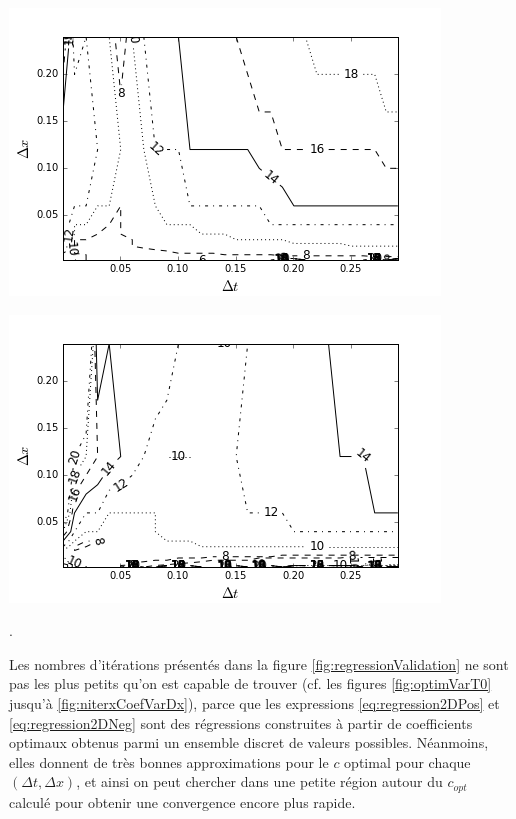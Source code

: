 \begingroup
\noindent
\begin{minipage}[t]{.45\linewidth}
	\includegraphics[scale=.45]{figures/FinalFigures/contourValidationN.png}
\end{minipage}
\hfill
\begin{minipage}[t]{.45\linewidth}
	\includegraphics[scale=.45]{figures/FinalFigures/contourValidationP.png}
\end{minipage}
.
\endgroup

\indent Les nombres d'itérations présentés dans la figure \ref{fig:regressionValidation} ne sont pas les plus petits qu'on est capable de trouver (cf. les figures \ref{fig:optimVarT0} jusqu'à \ref{fig:niterxCoefVarDx}), parce que les expressions \eqref{eq:regression2DPos} et \eqref{eq:regression2DNeg} sont des régressions construites à partir de coefficients optimaux obtenus parmi un ensemble discret de valeurs possibles. Néanmoins, elles donnent de très bonnes approximations pour le $c$ optimal pour chaque $(\Delta t, \Delta x)$, et ainsi on peut chercher dans une petite région autour du $c_{opt}$ calculé pour obtenir une convergence encore plus rapide.

